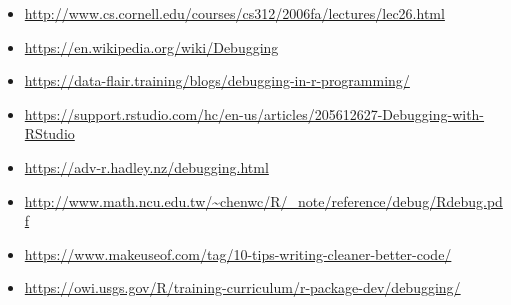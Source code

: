 \documentclass[
]{book}
\begin{document}
\begin{itemize}
\item
  \url{http://www.cs.cornell.edu/courses/cs312/2006fa/lectures/lec26.html}
\item
  \url{https://en.wikipedia.org/wiki/Debugging}
\item
  \url{https://data-flair.training/blogs/debugging-in-r-programming/}
\item
  \url{https://support.rstudio.com/hc/en-us/articles/205612627-Debugging-with-RStudio}
\item
  \url{https://adv-r.hadley.nz/debugging.html}
\item
  \url{http://www.math.ncu.edu.tw/~chenwc/R/_note/reference/debug/Rdebug.pdf}
\item
  \url{https://www.makeuseof.com/tag/10-tips-writing-cleaner-better-code/}
\item
  \url{https://owi.usgs.gov/R/training-curriculum/r-package-dev/debugging/}
\end{itemize}

  
\end{document}

